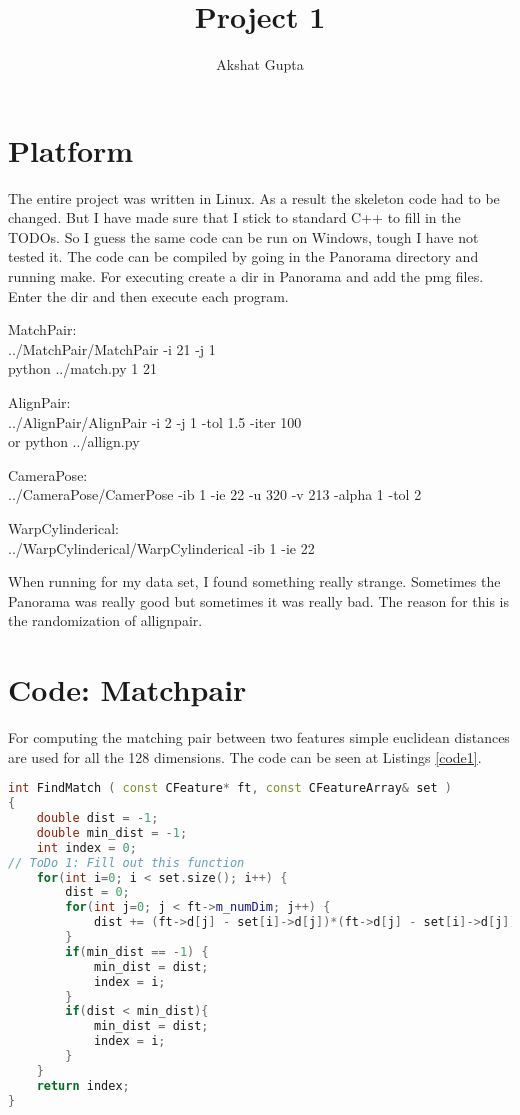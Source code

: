 \documentclass[11pt]{article}
\author{Akshat Gupta}
\title{Project 1}
\begin{document}
\lstset{%
    basicstyle=\small,          %
    identifierstyle=,           %
    stringstyle=\ttfamily,      %
    showstringspaces=false}     %

\maketitle
\tableofcontents
\newpage
\section{Platform}
The entire project was written in Linux. As a result the skeleton code had to be changed.
But I have made sure that I stick to standard C++ to fill in the TODOs. So I guess the same code can be run on Windows, tough I have not tested it.
The code can be compiled by going in the Panorama directory and running make.
For executing create a dir in Panorama and add the pmg files. Enter the dir and then execute each program.

MatchPair: \\
 ../MatchPair/MatchPair -i 21 -j 1 \\
python ../match.py 1 21

AlignPair: \\
../AlignPair/AlignPair -i 2 -j 1 -tol 1.5 -iter 100 \\
or python ../allign.py

CameraPose: \\
../CameraPose/CamerPose -ib 1 -ie 22 -u 320 -v 213 -alpha 1 -tol 2

WarpCylinderical: \\
../WarpCylinderical/WarpCylinderical -ib 1 -ie 22

When running for my data set, I found something really strange. Sometimes the Panorama was really good but sometimes it was really bad. The reason for this is the randomization of allignpair.

\section{Code: Matchpair}
For computing the matching pair between two features simple euclidean distances are used for all the 128 dimensions. The code can be seen at Listings \ref{code1}.
\begin{lstlisting}[language=C++, caption={FindMatch()}, label=code1]
int FindMatch ( const CFeature* ft, const CFeatureArray& set )
{
    double dist = -1;
    double min_dist = -1;
    int index = 0;
// ToDo 1: Fill out this function
    for(int i=0; i < set.size(); i++) {
        dist = 0;
        for(int j=0; j < ft->m_numDim; j++) {
            dist += (ft->d[j] - set[i]->d[j])*(ft->d[j] - set[i]->d[j]);
        }
        if(min_dist == -1) {
            min_dist = dist;
            index = i;
        }
        if(dist < min_dist){
            min_dist = dist;
            index = i;
        }
    }
    return index;
}
\end{lstlisting}
\end{document}
